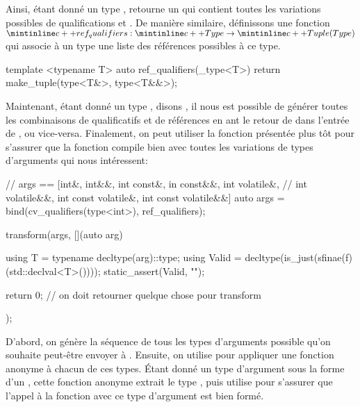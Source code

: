 Ainsi, étant donné un type ,  retourne un 
qui contient toutes les variations possibles de qualifications  et
. De manière similaire, définissons une fonction $\cc{ref_qualifiers}
: \cc{Type} \to \cc{Tuple(Type)}$ qui associe à un type une liste des références
possibles à ce type.
\begin{cpp}
    template <typename T>
    auto ref_qualifiers(_type<T>) {
        return make_tuple(type<T&>, type<T&&>);
    }
\end{cpp}

Maintenant, étant donné un type , disons , il nous est possible
de générer toutes les combinaisons de qualificatifs  et de
références en ant le retour de  dans l'entrée de
, ou vice-versa. Finalement, on peut utiliser la fonction
 présentée plus tôt pour s'assurer que la fonction  compile
bien avec toutes les variations de types d'arguments qui nous intéressent:
\begin{cpp}
    // args == [int&, int&&, int const&, in const&&, int volatile&,
    //          int volatile&&, int const volatile&, int const volatile&&]
    auto args = bind(cv_qualifiers(type<int>), ref_qualifiers);

    transform(args, [](auto arg) {
        using T = typename decltype(arg)::type;
        using Valid = decltype(is_just(sfinae(f)(std::declval<T>())));
        static_assert(Valid{}, "");

        return 0; // on doit retourner quelque chose pour transform
    });
\end{cpp}

D'abord, on génère la séquence de tous les types d'arguments possible qu'on
souhaite peut-être envoyer à . Ensuite, on utilise  pour
appliquer une fonction anonyme à chacun de ces types. Étant donné un type
d'argument sous la forme d'un , cette fonction anonyme extrait le
type , puis utilise  pour s'assurer que l'appel à la fonction
 avec ce type d'argument est bien formé.
